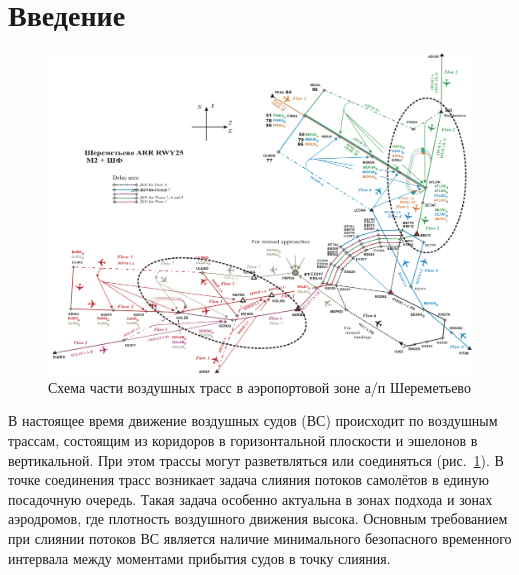 \documentclass[12pt]{article}
\theoremstyle{plain}
\begin{document}
\newpage


\section*{Введение}

\begin{figure}[p]
  \centering

  \includegraphics[height=0.99\textwidth,angle=90]{Complete.png}

  \caption{Схема части воздушных трасс в аэропортовой зоне а/п Шереметьево}
  \label{fig:Sherem}
\end{figure}

В настоящее время движение воздушных судов (ВС) происходит по воздушным трассам, состоящим из коридоров в горизонтальной плоскости и эшелонов в вертикальной. При этом трассы могут разветвляться или соединяться (рис.~\ref{fig:Sherem}). В точке соединения трасс возникает задача слияния потоков самолётов в единую посадочную очередь. Такая задача особенно актуальна в зонах подхода и зонах аэродромов, где плотность воздушного движения высока. Основным требованием при слиянии потоков ВС является наличие минимального безопасного временного интервала между моментами прибытия судов в точку слияния.
\end{document}
